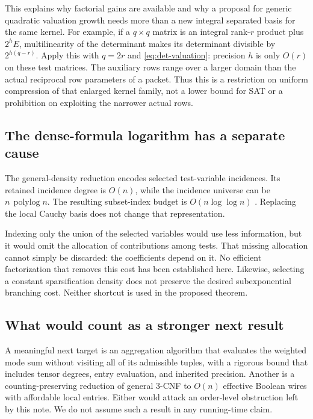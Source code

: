 \documentclass[11pt]{article}
\theoremstyle{remark}
\newcommand{\polylog}{\operatorname{polylog}}
\begin{document}
This explains why factorial gains are available and why a proposal for generic quadratic valuation growth needs more than a new integral separated basis for the same kernel. For example, if a $q\times q$ matrix is an integral rank-$r$ product plus $2^hE$, multilinearity of the determinant makes its determinant divisible by $2^{h(q-r)}$. Apply this with $q=2r$ and \eqref{eq:det-valuation}: precision $h$ is only $O(r)$ on these test matrices. The auxiliary rows range over a larger domain than the actual reciprocal row parameters of a packet. Thus this is a restriction on uniform compression of that enlarged kernel family, not a lower bound for SAT or a prohibition on exploiting the narrower actual rows.

\subsection{The dense-formula logarithm has a separate cause}

The general-density reduction encodes selected test-variable incidences. Its retained incidence degree is $O(n)$, while the incidence universe can be $n\,\polylog n$. The resulting subset-index budget is $O(n\log\log n)$ \cite{reduction}. Replacing the local Cauchy basis does not change that representation.

Indexing only the union of the selected variables would use less information, but it would omit the allocation of contributions among tests. That missing allocation cannot simply be discarded: the coefficients depend on it. No efficient factorization that removes this cost has been established here. Likewise, selecting a constant sparsification density does not preserve the desired subexponential branching cost. Neither shortcut is used in the proposed theorem.

\subsection{What would count as a stronger next result}

A meaningful next target is an aggregation algorithm that evaluates the weighted mode sum without visiting all of its admissible tuples, with a rigorous bound that includes tensor degrees, entry evaluation, and inherited precision. Another is a counting-preserving reduction of general 3-CNF to $O(n)$ effective Boolean wires with affordable local entries. Either would attack an order-level obstruction left by this note. We do not assume such a result in any running-time claim.
\end{document}

